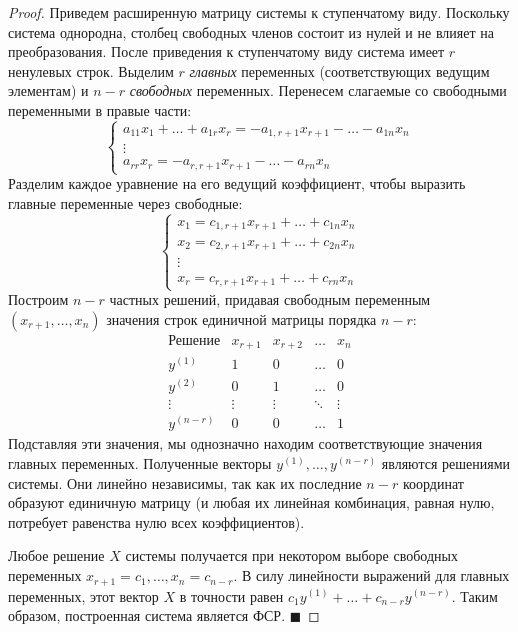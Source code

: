 \begin{proof}
Приведем расширенную матрицу системы к ступенчатому виду. Поскольку система однородна, столбец свободных членов состоит из нулей и не влияет на преобразования. После приведения к ступенчатому виду система имеет $r$ ненулевых строк. 
Выделим $r$ \textit{главных} переменных (соответствующих ведущим элементам) и $n - r$ \textit{свободных} переменных. Перенесем слагаемые со свободными переменными в правые части:
\[
\begin{cases}
a_{11}x_1 + \dots + a_{1r}x_r = -a_{1,r+1}x_{r+1} - \dots - a_{1n}x_n \\
\vdots \\
a_{rr}x_r = -a_{r,r+1}x_{r+1} - \dots - a_{rn}x_n
\end{cases}
\]
Разделим каждое уравнение на его ведущий коэффициент, чтобы выразить главные переменные через свободные:
\[
\begin{cases}
x_1 = c_{1,r+1}x_{r+1} + \dots + c_{1n}x_n \\
x_2 = c_{2,r+1}x_{r+1} + \dots + c_{2n}x_n \\
\vdots \\
x_r = c_{r,r+1}x_{r+1} + \dots + c_{rn}x_n
\end{cases}
\]
Построим $n - r$ частных решений, придавая свободным переменным $(x_{r+1}, \dots, x_n)$ значения строк единичной матрицы порядка $n - r$:
\[
\begin{array}{c|cccc}
\text{Решение} & x_{r+1} & x_{r+2} & \dots & x_n \\
\hline
y^{(1)} & 1 & 0 & \dots & 0 \\
y^{(2)} & 0 & 1 & \dots & 0 \\
\vdots & \vdots & \vdots & \ddots & \vdots \\
y^{(n-r)} & 0 & 0 & \dots & 1
\end{array}
\]
Подставляя эти значения, мы однозначно находим соответствующие значения главных переменных. Полученные векторы $y^{(1)}, \dots, y^{(n-r)}$ являются решениями системы. Они линейно независимы, так как их последние $n - r$ координат образуют единичную матрицу (и любая их линейная комбинация, равная нулю, потребует равенства нулю всех коэффициентов).

Любое решение $X$ системы получается при некотором выборе свободных переменных $x_{r+1}=c_1, \dots, x_n=c_{n-r}$. В силу линейности выражений для главных переменных, этот вектор $X$ в точности равен $c_1 y^{(1)} + \dots + c_{n-r} y^{(n-r)}$. Таким образом, построенная система является ФСР.
\hfill$\blacksquare$
\end{proof}

